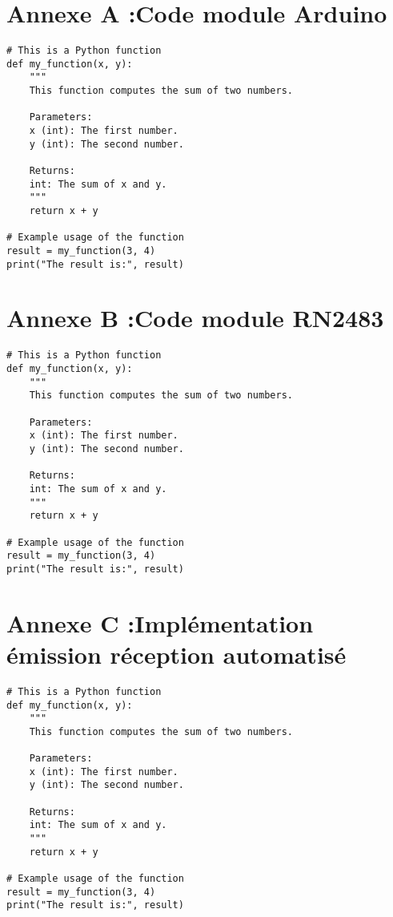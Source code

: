 \chapter{Annexe A :Code module Arduino}\label{codearduino}


\renewcommand{\leftmark}{Annexes}

\begin{lstlisting}[caption={Example Python code}, label={lst:example}]
# This is a Python function
def my_function(x, y):
    """
    This function computes the sum of two numbers.
    
    Parameters:
    x (int): The first number.
    y (int): The second number.
    
    Returns:
    int: The sum of x and y.
    """
    return x + y

# Example usage of the function
result = my_function(3, 4)
print("The result is:", result)
\end{lstlisting}


\chapter{Annexe B :Code module RN2483}\label{codern}

\begin{lstlisting}[caption={Example Python code}, label={lst:example}]
# This is a Python function
def my_function(x, y):
    """
    This function computes the sum of two numbers.
    
    Parameters:
    x (int): The first number.
    y (int): The second number.
    
    Returns:
    int: The sum of x and y.
    """
    return x + y

# Example usage of the function
result = my_function(3, 4)
print("The result is:", result)
\end{lstlisting}

\chapter{Annexe C :Implémentation émission réception automatisé}\label{codeauto}

\begin{lstlisting}[caption={Example Python code}, label={lst:example}]
# This is a Python function
def my_function(x, y):
    """
    This function computes the sum of two numbers.
    
    Parameters:
    x (int): The first number.
    y (int): The second number.
    
    Returns:
    int: The sum of x and y.
    """
    return x + y

# Example usage of the function
result = my_function(3, 4)
print("The result is:", result)
\end{lstlisting}